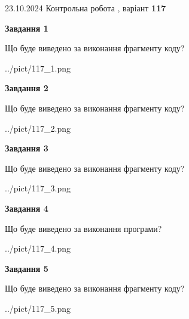 \documentclass[12pt, ukrainian]{article}
\begin{document}
{\Large{23.10.2024 Контрольна робота , варіант  \No \textbf { 117 }\par}}
{
\begin {large}
{\begin {center}\textbf{Завдання 1}\end {center}}

Що буде виведено за виконання фрагменту коду?\par
\begin{center}
	{../pict/117_1.png}
\end{center}
\newpage

{\begin {center}\textbf{Завдання 2}\end {center}}

Що буде виведено за виконання фрагменту коду?\par
\begin{center}
	{../pict/117_2.png}
\end{center}
\newpage

{\begin {center}\textbf{Завдання 3}\end {center}}

Що буде виведено за виконання фрагменту коду?\par
\begin{center}
	{../pict/117_3.png}
\end{center}
\newpage

{\begin {center}\textbf{Завдання 4}\end {center}}

Що буде виведено за виконання програми?\par
\begin{center}
	{../pict/117_4.png}
\end{center}
\newpage

{\begin {center}\textbf{Завдання 5}\end {center}}

Що буде виведено за виконання фрагменту коду?\par
\begin{center}
	{../pict/117_5.png}
\end{center}
\newpage


\end{large}}
\end{document}
